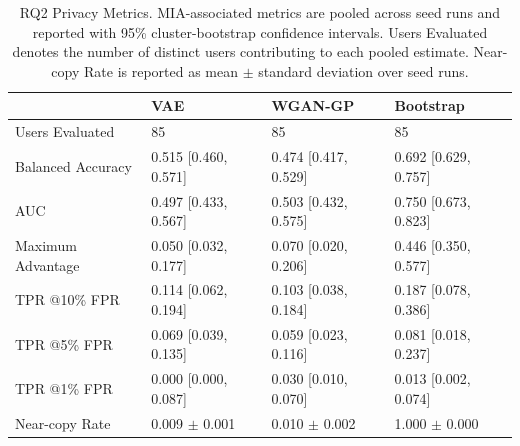 \begin{table}[ht]
\centering
\begin{tabular}{llll}
\toprule
 & VAE & WGAN-GP & Bootstrap \\
\midrule
Users Evaluated & 85 & 85 & 85 \\
Balanced Accuracy & 0.515 [0.460, 0.571] & 0.474 [0.417, 0.529] & 0.692 [0.629, 0.757] \\
AUC & 0.497 [0.433, 0.567] & 0.503 [0.432, 0.575] & 0.750 [0.673, 0.823] \\
Maximum Advantage & 0.050 [0.032, 0.177] & 0.070 [0.020, 0.206] & 0.446 [0.350, 0.577] \\
TPR @10\% FPR & 0.114 [0.062, 0.194] & 0.103 [0.038, 0.184] & 0.187 [0.078, 0.386] \\
TPR @5\% FPR & 0.069 [0.039, 0.135] & 0.059 [0.023, 0.116] & 0.081 [0.018, 0.237] \\
TPR @1\% FPR & 0.000 [0.000, 0.087] & 0.030 [0.010, 0.070] & 0.013 [0.002, 0.074] \\
Near-copy Rate & 0.009 $\pm$ 0.001 & 0.010 $\pm$ 0.002 & 1.000 $\pm$ 0.000 \\
\bottomrule
\end{tabular}
\caption{RQ2 Privacy Metrics. MIA-associated metrics are pooled across seed runs and reported with 95\% cluster-bootstrap confidence intervals. Users Evaluated denotes the number of distinct users contributing to each pooled estimate. Near-copy Rate is reported as mean $\pm$ standard deviation over seed runs.}
\label{tab:rq2_privacy}
\end{table}
